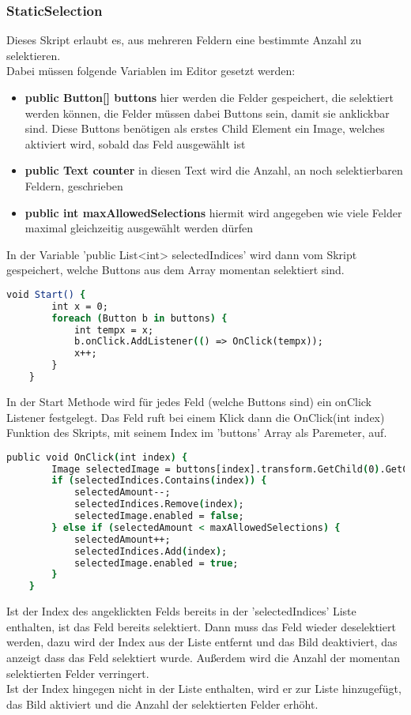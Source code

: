 {\subsubsection{StaticSelection}
Dieses Skript erlaubt es, aus mehreren Feldern eine bestimmte Anzahl zu selektieren.\\
Dabei müssen folgende Variablen im Editor gesetzt werden:
\begin{itemize}
\item \textbf{public Button[] buttons} hier werden die Felder gespeichert, die selektiert werden können, die Felder müssen dabei Buttons sein, damit sie anklickbar sind. Diese Buttons benötigen als erstes Child Element ein Image, welches aktiviert wird, sobald das Feld ausgewählt ist
\item \textbf{public Text counter} in diesen Text wird die Anzahl, an noch selektierbaren Feldern, geschrieben
\item \textbf{public int maxAllowedSelections} hiermit wird angegeben wie viele Felder maximal gleichzeitig ausgewählt werden dürfen
\end{itemize}
In der Variable 'public List<int> selectedIndices' wird dann vom Skript gespeichert, welche Buttons aus dem Array momentan selektiert sind.\\
\begin{lstlisting}[language=csh, caption={Start Methode des StaticSelection Skripts}]
void Start() {
        int x = 0;
        foreach (Button b in buttons) {
            int tempx = x;
            b.onClick.AddListener(() => OnClick(tempx));
            x++;
        }
    }
\end{lstlisting}
In der Start Methode wird für jedes Feld (welche Buttons sind) ein onClick Listener festgelegt. Das Feld ruft bei einem Klick dann die OnClick(int index) Funktion des Skripts, mit seinem Index im 'buttons' Array als Paremeter, auf.
\begin{lstlisting}[language=csh, caption={OnClick Methode des StaticSelection Skripts}]
public void OnClick(int index) {
        Image selectedImage = buttons[index].transform.GetChild(0).GetComponent<Image>();
        if (selectedIndices.Contains(index)) {
            selectedAmount--;
            selectedIndices.Remove(index);
            selectedImage.enabled = false;
        } else if (selectedAmount < maxAllowedSelections) {
            selectedAmount++;
            selectedIndices.Add(index);
            selectedImage.enabled = true;
        }
    }
\end{lstlisting}
Ist der Index des angeklickten Felds bereits in der 'selectedIndices' Liste enthalten, ist das Feld bereits selektiert. Dann muss das Feld wieder deselektiert werden, dazu wird der Index aus der Liste entfernt und das Bild deaktiviert, das anzeigt dass das Feld selektiert wurde. Außerdem wird die Anzahl der momentan selektierten Felder verringert.\\
Ist der Index hingegen nicht in der Liste enthalten, wird er zur Liste hinzugefügt, das Bild aktiviert und die Anzahl der selektierten Felder erhöht.\\

}
